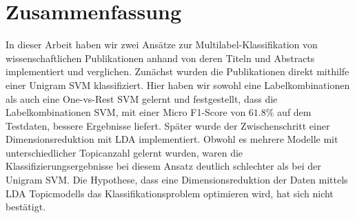 \section{Zusammenfassung}

In dieser Arbeit haben wir zwei Ansätze zur Multilabel-Klassifikation von wissenschaftlichen Publikationen anhand von deren Titeln und Abstracts implementiert und verglichen.
Zunächst wurden die Publikationen direkt mithilfe einer Unigram SVM klassifiziert.
Hier haben wir sowohl eine Labelkombinationen als auch eine One-vs-Rest SVM gelernt und festgestellt, dass die Labelkombinationen SVM, mit einer Micro F1-Score von $61.8 \%$ auf dem Testdaten, bessere Ergebnisse liefert.
Später wurde der Zwischenschritt einer Dimensionsreduktion mit LDA implementiert.
Obwohl es mehrere Modelle mit unterschiedlicher Topicanzahl gelernt wurden, waren die Klassifizierungsergebnisse bei diesem Ansatz deutlich schlechter als bei der Unigram SVM.
Die Hypothese, dass eine Dimensionsreduktion der Daten mittels LDA Topicmodells das Klassifikationsproblem optimieren wird, hat sich nicht bestätigt.

